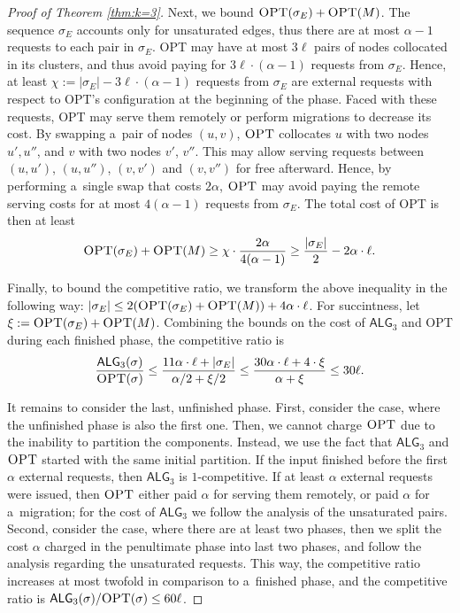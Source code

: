 \documentclass[a4paper,anonymous,USenglish]{lipics-v2019}
\newcommand{\OPT}{\textsc{OPT}\xspace}
\newcommand{\TAlg}{{\ensuremath{\textsf{ALG}_{3}}}\xspace}
\begin{document}
\begin{proof}[Proof of Theorem \ref{thm:k=3}]
	Next, we bound $\OPT(\sigma_E) + \OPT(M)$.
	The sequence $\sigma_E$ accounts only for unsaturated edges, thus there are at most $\alpha-1$ requests to each pair in $\sigma_E$.
	\OPT may have at most $3\ell$ pairs of nodes collocated in its clusters, and thus avoid paying for $3\ell\cdot(\alpha-1)$ requests from $\sigma_E$.
	Hence, at least $\chi := |\sigma_E| - 3\ell\cdot(\alpha-1)$ requests from $\sigma_E$ are external requests with respect to \OPT's configuration at the beginning of the phase.
	Faced with these requests, \OPT may serve them remotely or perform migrations to decrease its cost.
	By swapping a~pair of nodes $(u,v)$, $\OPT$ collocates $u$ with two nodes $u', u''$, and $v$ with two nodes $v'$, $v''$.
	This may allow serving requests between $(u,u')$, $(u,u'')$, $(v,v')$ and $(v,v'')$ for free afterward.
	Hence, by performing a~single swap that costs $2\alpha$, $\OPT$ may avoid paying the remote serving costs for at most $4 (\alpha - 1)$ requests from $\sigma_E$.
	The total cost of \OPT is then at least
	\[
		\OPT(\sigma_E) + \OPT(M) \geq \chi \cdot \frac{2\alpha}{4 (\alpha-1)}\geq \frac{|\sigma_E|} {2} - 2 \alpha \cdot \ell.
	\]
	
	Finally, to bound the competitive ratio, we transform the above inequality in the following way: $|\sigma_E| \leq 2(\OPT(\sigma_E)+\OPT(M)) + 4\alpha \cdot \ell$.
	For succintness, let $\xi := \OPT(\sigma_E) + \OPT(M)$.
	Combining the bounds on the cost of \TAlg and \OPT during each finished phase, the competitive ratio is
%
	\[
		\frac{\TAlg(\sigma)}{\OPT(\sigma)} \leq \frac{11\alpha \cdot \ell + |\sigma_E|}{\alpha/2 + \xi/2} \leq \frac{30\alpha\cdot\ell + 4\cdot \xi}{\alpha + \xi} \leq 30 \ell.
	\]
%	
	\medskip
	
	It remains to consider the last, unfinished phase.
	First, consider the case, where the unfinished phase is also the first one.
	Then, we cannot charge $\OPT$ due to the inability to partition the components.
	Instead, we use the fact that \TAlg and $\OPT$ started with the same initial partition.
	If the input finished before the first $\alpha$ external requests, then \TAlg is $1$-competitive.
	If at least $\alpha$ external requests were issued, then $\OPT$ either paid $\alpha$ for serving them remotely, or paid $\alpha$ for a~migration; for the cost of \TAlg we follow the analysis of the unsaturated pairs.
	Second, consider the case, where there are at least two phases, then we split the cost $\alpha$ charged in the penultimate phase into last two phases, and follow the analysis regarding the unsaturated requests.
	This way, the competitive ratio increases at most twofold in comparison to a~finished phase, and the competitive ratio is $\TAlg(\sigma)/\OPT(\sigma) \leq 60\ell$.
\end{proof}
\end{document}
